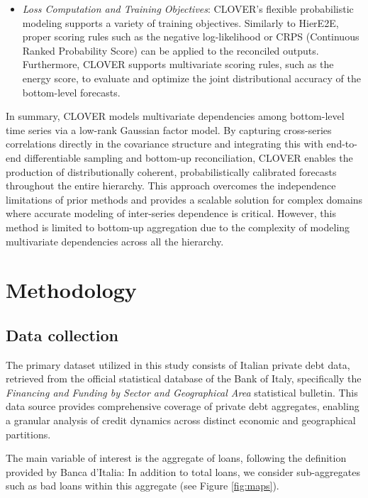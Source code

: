 \documentclass[letterpaper]{article}
\begin{document}
\begin{itemize}
\item \textit{Loss Computation and Training Objectives}: CLOVER’s flexible probabilistic modeling supports a variety of training objectives. Similarly to HierE2E, proper scoring rules such as the negative log-likelihood or CRPS (Continuous Ranked Probability Score) can be applied to the reconciled outputs. Furthermore, CLOVER supports multivariate scoring rules, such as the energy score, to evaluate and optimize the joint distributional accuracy of the bottom-level forecasts.
\end{itemize}

In summary, CLOVER models multivariate dependencies among bottom-level time series via a low-rank Gaussian factor model. By capturing cross-series correlations directly in the covariance structure and integrating this with end-to-end differentiable sampling and bottom-up reconciliation, CLOVER enables the production of distributionally coherent, probabilistically calibrated forecasts throughout the entire hierarchy. This approach overcomes the independence limitations of prior methods and provides a scalable solution for complex domains where accurate modeling of inter-series dependence is critical. However, this method is limited to bottom-up aggregation due to the complexity of modeling multivariate dependencies across all the hierarchy. 

\section{Methodology}
\subsection{Data collection}

The primary dataset utilized in this study consists of Italian private debt data, retrieved from the official statistical database of the Bank of Italy, specifically the \textit{Financing and Funding by Sector and Geographical Area} statistical bulletin. This data source provides comprehensive coverage of private debt aggregates, enabling a granular analysis of credit dynamics across distinct economic and geographical partitions.

The main variable of interest is the aggregate of loans, following the definition provided by Banca d'Italia:  In addition to total loans, we consider sub-aggregates such as bad loans within this aggregate (see Figure \ref{fig:maps}).
\end{document}
